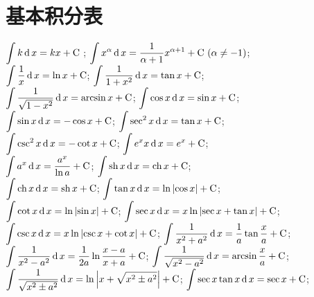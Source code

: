 \section{基本积分表}
\begin{tabenum}[(1)]
  \tabenumitem $\displaystyle\int k \operatorname{\mathop{}\!\mathrm{d}} x = kx + \text{C}$ ;\quad
  \tabenumitem $\displaystyle\int x^\alpha \operatorname{\mathop{}\!\mathrm{d}} x = \dfrac{1}{\alpha+1} x^{\alpha+1} + \text{C}\ (\alpha \ne -1)$;\\
  \tabenumitem $\displaystyle\int \dfrac{1}{x} \operatorname{\mathop{}\!\mathrm{d}} x = \ln x + \text{C}$;
  \tabenumitem $\displaystyle\int \dfrac{1}{1+x^2} \operatorname{\mathop{}\!\mathrm{d}} x = \tan x + \text{C}$;\\
  \tabenumitem $\displaystyle\int \dfrac{1}{\sqrt{1-x^2}} \operatorname{\mathop{}\!\mathrm{d}} x = \arcsin x + \text{C}$;
  \tabenumitem $\displaystyle\int \cos x \operatorname{\mathop{}\!\mathrm{d}} x = \sin x + \text{C}$;\\
  \tabenumitem $\displaystyle\int \sin x \operatorname{\mathop{}\!\mathrm{d}} x = - \cos x + \text{C}$;
  \tabenumitem $\displaystyle\int \sec^2 x \operatorname{\mathop{}\!\mathrm{d}} x = \tan x + \text{C}$;\\
  \tabenumitem $\displaystyle\int \csc^2 x \operatorname{\mathop{}\!\mathrm{d}} x = - \cot x + \text{C}$;
  \tabenumitem $\displaystyle\int e^x x \operatorname{\mathop{}\!\mathrm{d}} x = e^x + \text{C}$;\\
  \tabenumitem $\displaystyle\int a^x \operatorname{\mathop{}\!\mathrm{d}} x = \dfrac{a^x}{\ln a} + \text{C}$;
  \tabenumitem $\displaystyle\int \text{sh\,} x \operatorname{\mathop{}\!\mathrm{d}} x = \text{ch\,} x + \text{C}$;\\
  \tabenumitem $\displaystyle\int \text{ch\,} x \operatorname{\mathop{}\!\mathrm{d}} x = \text{sh\,} x + \text{C}$;
  \tabenumitem $\displaystyle\int \tan x \operatorname{\mathop{}\!\mathrm{d}} x = \ln \left| \cos x \right| + \text{C}$;\\
  \tabenumitem $\displaystyle\int \cot x \operatorname{\mathop{}\!\mathrm{d}} x = \ln \left| \sin x \right| + \text{C}$;
  \tabenumitem $\displaystyle\int \sec x \operatorname{\mathop{}\!\mathrm{d}} x = x \ln \left|\sec x + \tan x \right| + \text{C}$;\\
  \tabenumitem $\displaystyle\int \csc x \operatorname{\mathop{}\!\mathrm{d}} x = x \ln \left|\csc x + \cot x \right| + \text{C}$;
  \tabenumitem $\displaystyle\int \dfrac{1}{x^2 + a^2} \operatorname{\mathop{}\!\mathrm{d}} x = \dfrac{1}{a} \tan \dfrac{x}{a} + \text{C}$;\\
  \tabenumitem $\displaystyle\int \dfrac{1}{x^2 - a^2} \operatorname{\mathop{}\!\mathrm{d}} x = \dfrac{1}{2a} \ln \dfrac{x-a}{x+a} + \text{C}$;
  \tabenumitem $\displaystyle\int \dfrac{1}{\sqrt{x^2 - a^2}} \operatorname{\mathop{}\!\mathrm{d}} x = \arcsin \dfrac{x}{a} + \text{C}$;\\
  \tabenumitem $\displaystyle\int \dfrac{1}{\sqrt{x^2 \pm a^2}} \operatorname{\mathop{}\!\mathrm{d}} x = \ln \left|x + \sqrt{x^2 \pm a^2} \right| + \text{C}$;
  \tabenumitem $\displaystyle\int \sec x \tan x \operatorname{\mathop{}\!\mathrm{d}} x = \sec x + \text{C}$;\\

\end{tabenum}
